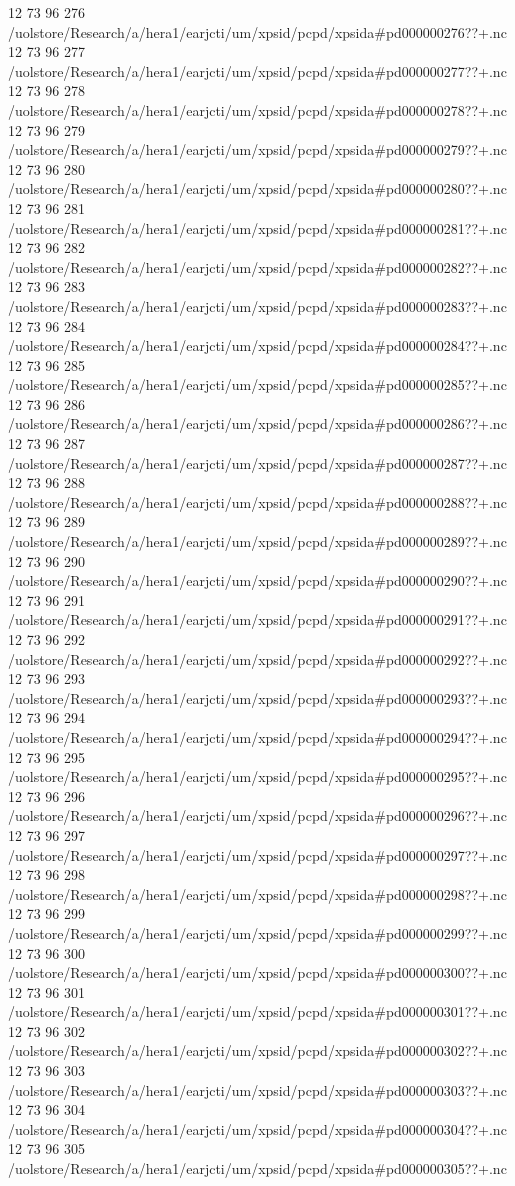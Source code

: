 12 73 96
276
/uolstore/Research/a/hera1/earjcti/um/xpsid/pcpd/xpsida#pd000000276??+.nc
12 73 96
277
/uolstore/Research/a/hera1/earjcti/um/xpsid/pcpd/xpsida#pd000000277??+.nc
12 73 96
278
/uolstore/Research/a/hera1/earjcti/um/xpsid/pcpd/xpsida#pd000000278??+.nc
12 73 96
279
/uolstore/Research/a/hera1/earjcti/um/xpsid/pcpd/xpsida#pd000000279??+.nc
12 73 96
280
/uolstore/Research/a/hera1/earjcti/um/xpsid/pcpd/xpsida#pd000000280??+.nc
12 73 96
281
/uolstore/Research/a/hera1/earjcti/um/xpsid/pcpd/xpsida#pd000000281??+.nc
12 73 96
282
/uolstore/Research/a/hera1/earjcti/um/xpsid/pcpd/xpsida#pd000000282??+.nc
12 73 96
283
/uolstore/Research/a/hera1/earjcti/um/xpsid/pcpd/xpsida#pd000000283??+.nc
12 73 96
284
/uolstore/Research/a/hera1/earjcti/um/xpsid/pcpd/xpsida#pd000000284??+.nc
12 73 96
285
/uolstore/Research/a/hera1/earjcti/um/xpsid/pcpd/xpsida#pd000000285??+.nc
12 73 96
286
/uolstore/Research/a/hera1/earjcti/um/xpsid/pcpd/xpsida#pd000000286??+.nc
12 73 96
287
/uolstore/Research/a/hera1/earjcti/um/xpsid/pcpd/xpsida#pd000000287??+.nc
12 73 96
288
/uolstore/Research/a/hera1/earjcti/um/xpsid/pcpd/xpsida#pd000000288??+.nc
12 73 96
289
/uolstore/Research/a/hera1/earjcti/um/xpsid/pcpd/xpsida#pd000000289??+.nc
12 73 96
290
/uolstore/Research/a/hera1/earjcti/um/xpsid/pcpd/xpsida#pd000000290??+.nc
12 73 96
291
/uolstore/Research/a/hera1/earjcti/um/xpsid/pcpd/xpsida#pd000000291??+.nc
12 73 96
292
/uolstore/Research/a/hera1/earjcti/um/xpsid/pcpd/xpsida#pd000000292??+.nc
12 73 96
293
/uolstore/Research/a/hera1/earjcti/um/xpsid/pcpd/xpsida#pd000000293??+.nc
12 73 96
294
/uolstore/Research/a/hera1/earjcti/um/xpsid/pcpd/xpsida#pd000000294??+.nc
12 73 96
295
/uolstore/Research/a/hera1/earjcti/um/xpsid/pcpd/xpsida#pd000000295??+.nc
12 73 96
296
/uolstore/Research/a/hera1/earjcti/um/xpsid/pcpd/xpsida#pd000000296??+.nc
12 73 96
297
/uolstore/Research/a/hera1/earjcti/um/xpsid/pcpd/xpsida#pd000000297??+.nc
12 73 96
298
/uolstore/Research/a/hera1/earjcti/um/xpsid/pcpd/xpsida#pd000000298??+.nc
12 73 96
299
/uolstore/Research/a/hera1/earjcti/um/xpsid/pcpd/xpsida#pd000000299??+.nc
12 73 96
300
/uolstore/Research/a/hera1/earjcti/um/xpsid/pcpd/xpsida#pd000000300??+.nc
12 73 96
301
/uolstore/Research/a/hera1/earjcti/um/xpsid/pcpd/xpsida#pd000000301??+.nc
12 73 96
302
/uolstore/Research/a/hera1/earjcti/um/xpsid/pcpd/xpsida#pd000000302??+.nc
12 73 96
303
/uolstore/Research/a/hera1/earjcti/um/xpsid/pcpd/xpsida#pd000000303??+.nc
12 73 96
304
/uolstore/Research/a/hera1/earjcti/um/xpsid/pcpd/xpsida#pd000000304??+.nc
12 73 96
305
/uolstore/Research/a/hera1/earjcti/um/xpsid/pcpd/xpsida#pd000000305??+.nc
